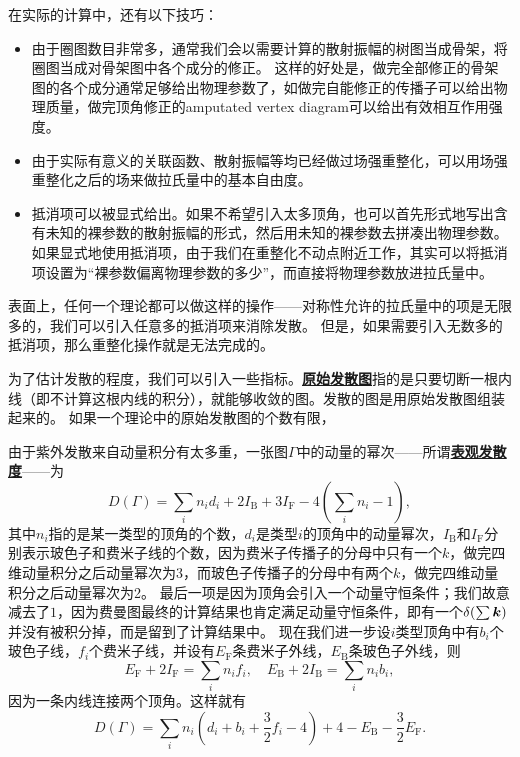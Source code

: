 \documentclass[hyperref, UTF8, a4paper]{ctexart}
\newcommand{\concept}[1]{\underline{\textbf{#1}}}
\begin{document}
在实际的计算中，还有以下技巧：
\begin{itemize}
    \item 由于圈图数目非常多，通常我们会以需要计算的散射振幅的树图当成骨架，将圈图当成对骨架图中各个成分的修正。
    这样的好处是，做完全部修正的骨架图的各个成分通常足够给出物理参数了，如做完自能修正的传播子可以给出物理质量，做完顶角修正的amputated vertex diagram可以给出有效相互作用强度。
    \item 由于实际有意义的关联函数、散射振幅等均已经做过场强重整化，可以用场强重整化之后的场来做拉氏量中的基本自由度。
    \item 抵消项可以被显式给出。如果不希望引入太多顶角，也可以首先形式地写出含有未知的裸参数的散射振幅的形式，然后用未知的裸参数去拼凑出物理参数。
    如果显式地使用抵消项，由于我们在重整化不动点附近工作，其实可以将抵消项设置为“裸参数偏离物理参数的多少”，而直接将物理参数放进拉氏量中。
\end{itemize}

表面上，任何一个理论都可以做这样的操作——对称性允许的拉氏量中的项是无限多的，我们可以引入任意多的抵消项来消除发散。
但是，如果需要引入无数多的抵消项，那么重整化操作就是无法完成的。

为了估计发散的程度，我们可以引入一些指标。\concept{原始发散图}指的是只要切断一根内线（即不计算这根内线的积分），就能够收敛的图。发散的图是用原始发散图组装起来的。
如果一个理论中的原始发散图的个数有限，

由于紫外发散来自动量积分有太多重，一张图$\Gamma$中的动量的幂次——所谓\concept{表观发散度}——为
\begin{equation}
    D(\Gamma) = \sum_i n_i d_i + 2 I_\text{B} + 3 I_\text{F} - 4(\sum_i n_i - 1),
\end{equation}
其中$n_i$指的是某一类型的顶角的个数，$d_i$是类型$i$的顶角中的动量幂次，$I_\text{B}$和$I_\text{F}$分别表示玻色子和费米子线的个数，因为费米子传播子的分母中只有一个$k$，做完四维动量积分之后动量幂次为3，而玻色子传播子的分母中有两个$k$，做完四维动量积分之后动量幂次为2。
最后一项是因为顶角会引入一个动量守恒条件；我们故意减去了$1$，因为费曼图最终的计算结果也肯定满足动量守恒条件，即有一个$\delta(\sum \vb*{k})$并没有被积分掉，而是留到了计算结果中。
现在我们进一步设$i$类型顶角中有$b_i$个玻色子线，$f_i$个费米子线，并设有$E_\text{F}$条费米子外线，$E_\text{B}$条玻色子外线，则
\[
    E_\text{F} + 2 I_\text{F} = \sum_i n_i f_i, \quad E_\text{B} + 2 I_\text{B} = \sum_i n_i b_i,
\]
因为一条内线连接两个顶角。这样就有
\begin{equation}
    D(\Gamma) = \sum_i n_i \left( d_i + b_i + \frac{3}{2} f_i - 4  \right) + 4 - E_\text{B} - \frac{3}{2} E_\text{F}.
\end{equation}
\end{document}
